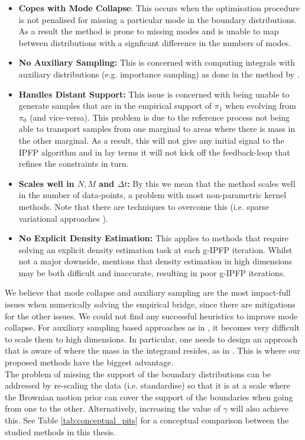 \documentclass[a4paper,12pt,twoside,openright]{report}
\theoremstyle{definition}
\begin{document}
\begin{itemize}
    \item \textbf{Copes with Mode Collapse}: This occurs when the optimisation procedure is not penalised for missing a particular mode in the boundary distributions. As a result the method is prone to missing modes and is unable to map between distributions with a signficant difference in the numbers of modes.
    \item \textbf{No Auxiliary Sampling:} This is concerned with computing integrals with auxiliary distributions (e.g. importance sampling) as done in the method by \cite{pavon2018data}.
    \item \textbf{Handles Distant Support:} This issue is concerned with being unable to generate samples that are in the empirical support of $\pi_1$ when evolving from $\pi_0$ (and vice-versa). This problem is due to the reference process not being able to transport samples from one marginal to areas where there is mass in the other marginal. As a result, this will not give any initial signal to the IPFP algorithm and in lay terms it will not kick off the feedback-loop that refines the constraints in turn.
    \item \textbf{Scales well in $N,M$ and $\Delta t$:} By this we mean that the method scales well in the number of data-points, a problem with most non-parametric kernel methods. Note that there are techniques to overcome this (i.e. sparse variational approaches \cite{van2019sparse}).
    \item \textbf{No Explicit Density Estimation:} This applies to methods that require solving an explicit density estimation task at each g-IPFP iteration. Whilst not a major downside,  \cite{pavon2018data} mentions that density estimation in high dimensions may be both difficult and inaccurate, resulting in poor g-IPFP iterations.
\end{itemize}
We believe that mode collapse  and auxiliary sampling are the most impact-full issues when numerically solving the empirical bridge, since there are mitigations for the other issues. We could not find any successful heuristics to improve mode collapse. For auxiliary sampling based approaches as in \cite{pavon2018data}, it becomes very difficult to scale them to high dimensions. In particular, one needs to design an approach that is aware of where the mass in the integrand resides, as in \cite{osborne2012active}. This is where our proposed methods have the biggest advantage.
\\The problem of missing the support of the boundary distributions can be addressed by re-scaling the data (i.e. standardise) so that it is at a scale where the Brownian motion prior can cover the support of the boundaries when going from one to the other. Alternatively, increasing the value of $\gamma$ will also achieve this. See Table \ref{tab:conceptual_pits} for a conceptual comparison between the studied methods in this thesis.
\end{document}
